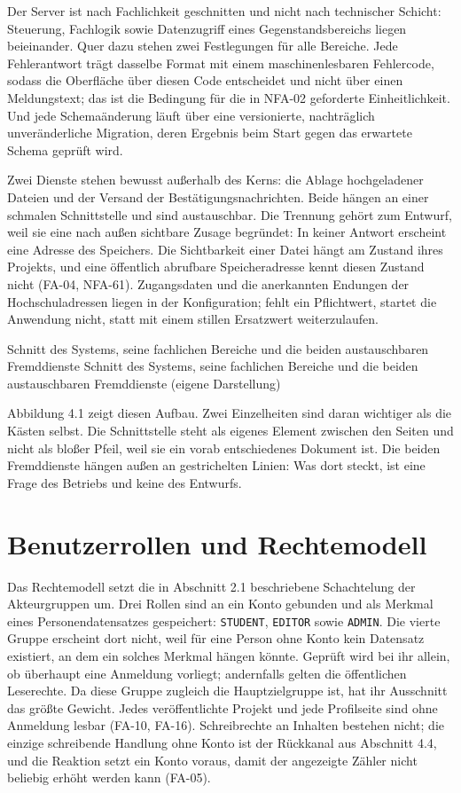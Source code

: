 Der Server ist nach Fachlichkeit geschnitten und nicht nach technischer Schicht: Steuerung, Fachlogik sowie Datenzugriff eines Gegenstandsbereichs liegen beieinander. Quer dazu stehen zwei Festlegungen für alle Bereiche. Jede Fehlerantwort trägt dasselbe Format mit einem maschinenlesbaren Fehlercode, sodass die Oberfläche über diesen Code entscheidet und nicht über einen Meldungstext; das ist die Bedingung für die in NFA-02 geforderte Einheitlichkeit. Und jede Schemaänderung läuft über eine versionierte, nachträglich unveränderliche Migration, deren Ergebnis beim Start gegen das erwartete Schema geprüft wird.

Zwei Dienste stehen bewusst außerhalb des Kerns: die Ablage hochgeladener Dateien und der Versand der Bestätigungsnachrichten. Beide hängen an einer schmalen Schnittstelle und sind austauschbar. Die Trennung gehört zum Entwurf, weil sie eine nach außen sichtbare Zusage begründet: In keiner Antwort erscheint eine Adresse des Speichers. Die Sichtbarkeit einer Datei hängt am Zustand ihres Projekts, und eine öffentlich abrufbare Speicheradresse kennt diesen Zustand nicht (FA-04, NFA-61). Zugangsdaten und die anerkannten Endungen der Hochschuladressen liegen in der Konfiguration; fehlt ein Pflichtwert, startet die Anwendung nicht, statt mit einem stillen Ersatzwert weiterzulaufen.

%
{Schnitt des Systems, seine fachlichen Bereiche und die beiden austauschbaren Fremddienste}%
{Schnitt des Systems, seine fachlichen Bereiche und die beiden austauschbaren Fremddienste (eigene Darstellung)}

Abbildung 4.1 zeigt diesen Aufbau. Zwei Einzelheiten sind daran wichtiger als die Kästen selbst. Die Schnittstelle steht als eigenes Element zwischen den Seiten und nicht als bloßer Pfeil, weil sie ein vorab entschiedenes Dokument ist. Die beiden Fremddienste hängen außen an gestrichelten Linien: Was dort steckt, ist eine Frage des Betriebs und keine des Entwurfs.

\section{Benutzerrollen und Rechtemodell}
\label{sec:rechtemodell}

Das Rechtemodell setzt die in Abschnitt 2.1 beschriebene Schachtelung der Akteurgruppen um. Drei Rollen sind an ein Konto gebunden und als Merkmal eines Personendatensatzes gespeichert: \texttt{STUDENT}, \texttt{EDITOR} sowie \texttt{ADMIN}. Die vierte Gruppe erscheint dort nicht, weil für eine Person ohne Konto kein Datensatz existiert, an dem ein solches Merkmal hängen könnte. Geprüft wird bei ihr allein, ob überhaupt eine Anmeldung vorliegt; andernfalls gelten die öffentlichen Leserechte. Da diese Gruppe zugleich die Hauptzielgruppe ist, hat ihr Ausschnitt das größte Gewicht. Jedes veröffentlichte Projekt und jede Profilseite sind ohne Anmeldung lesbar (FA-10, FA-16). Schreibrechte an Inhalten bestehen nicht; die einzige schreibende Handlung ohne Konto ist der Rückkanal aus Abschnitt 4.4, und die Reaktion setzt ein Konto voraus, damit der angezeigte Zähler nicht beliebig erhöht werden kann (FA-05).

